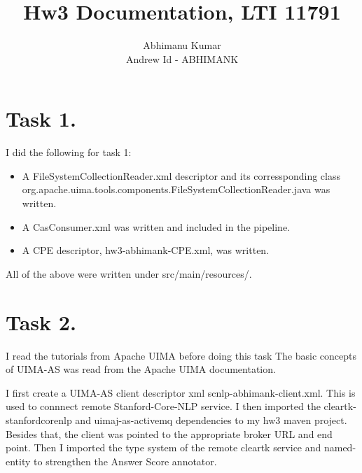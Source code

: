 \documentclass{article}
\title{Hw3 Documentation, LTI 11791}
\author{Abhimanu Kumar \\ Andrew Id - ABHIMANK}
\date
\begin{document}
\maketitle

\section{Task 1.}
I did the following for task 1:
\begin{itemize}

\item A FileSystemCollectionReader.xml descriptor and its corressponding class  
org.apache.uima.tools.components.FileSystemCollectionReader.java was written.
\item A CasConsumer.xml was written and included in the pipeline.
\item A CPE descriptor, hw3-abhimank-CPE.xml, was written.

\end{itemize}
All  of  the above were written under src/main/resources/.
\section{Task 2.}
I read the tutorials from Apache UIMA before doing this task 
The basic concepts of UIMA-AS was read from the Apache UIMA documentation.

I first create a UIMA-AS client descriptor xml scnlp-abhimank-client.xml. This is
used to connnect remote Stanford-Core-NLP service. I then imported the 
cleartk-stanfordcorenlp
and uimaj-as-activemq dependencies to my hw3 maven project. Besides that, the client 
was pointed to the appropriate broker URL and end point.
Then I imported the type system of the remote cleartk service and named-entity to 
strengthen the Answer Score annotator.
\end{document}
